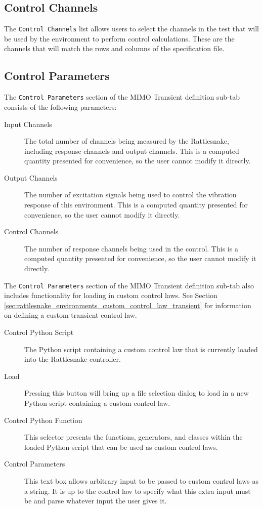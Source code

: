 \documentclass[pdf,12pt,report]{SANDreport}
\newcommand{\inlineCode}{\lstinline[basicstyle=\bfseries\ttfamily]}
\begin{document}
    \subsection{Control Channels}
    The \inlineCode{Control Channels} list allows users to select the channels in the test that will be used by the environment to perform control calculations.  These are the channels that will match the rows and columns of the specification file.
    
    \subsection{Control Parameters}
    The \inlineCode{Control Parameters} section of the \Ac{MIMO} Transient definition sub-tab consists of the following parameters:
    \begin{description}
           \item[Input Channels] The total number of channels being measured by the Rattlesnake, including response channels and output channels.  This is a computed quantity presented for convenience, so the user cannot modify it directly.
           
           \item[Output Channels] The number of excitation signals being used to control the vibration response of this environment.  This is a computed quantity presented for convenience, so the user cannot modify it directly.
           
           \item[Control Channels] The number of response channels being used in the control.  This is a computed quantity presented for convenience, so the user cannot modify it directly.

    \end{description}
       The \inlineCode{Control Parameters} section of the \Ac{MIMO} Transient definition sub-tab also includes functionality for loading in custom control laws.  See Section \ref{sec:rattlesnake_environments_custom_control_law_transient} for information on defining a custom transient control law.
       \begin{description}
           \item[Control Python Script] The Python script containing a custom control law that is currently loaded into the Rattlesnake controller.
           \item[Load] Pressing this button will bring up a file selection dialog to load in a new Python script containing a custom control law.
           \item[Control Python Function] This selector presents the functions, generators, and classes within the loaded Python script that can be used as custom control laws.
           \item[Control Parameters] This text box allows arbitrary input to be passed to custom control laws as a string.  It is up to the control law to specify what this extra input must be and parse whatever input the user gives it.
       \end{description}
\end{document}
